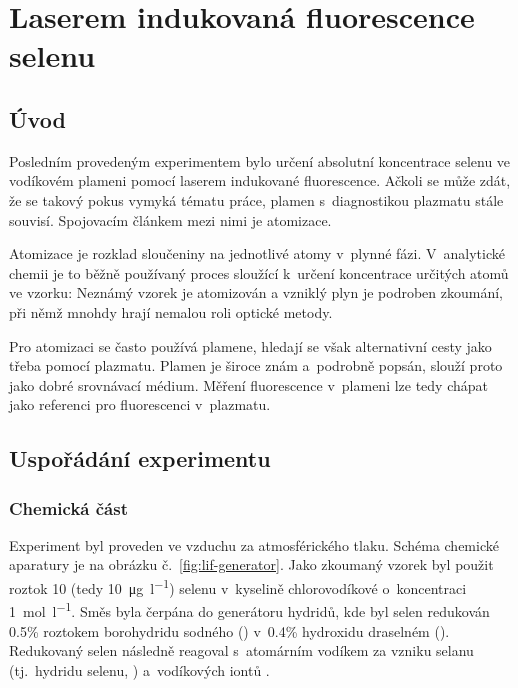 \chapter[LIF]{Laserem indukovaná fluorescence selenu}
\label{sec:lif}

\providecommand\xpos{x}
\providecommand\ypos{y}
\providecommand\xmm{x}
\providecommand\ymm{h}
\providecommand\voigtsigma{\sigma}
\providecommand\voigtgamma{\gamma}
\providecommand\lifslopex{\lifslope_\text{x}}
\providecommand\lifslopet{\lifslope_\text{t}}
\providecommand\lifsatx{\lifsat_\text{x}}
\providecommand\lifsatt{\lifsat_\text{t}}
\providecommand\lifslopeunit{10^9}
\providecommand\lifsatunit{\per\micro\joule}
\providecommand\ndensair{n_\text{R}}
\providecommand\ndensse{n_\text{Se}}
\providecommand\ndensseunc{\sigma_{\!n,\,\text{Se}}}
\renewcommand\einsteina{A_{32}}
\renewcommand\einsteinb{B_{13}}
\providecommand\einsteinai{A_{31}}



\section{Úvod}
\label{sec:lif-intro}
Posledním provedeným experimentem bylo určení absolutní koncentrace
selenu ve vodíkovém plameni pomocí laserem indukované fluorescence.
Ačkoli se může zdát, že se takový pokus vymyká tématu práce,
plamen s~diagnostikou plazmatu stále souvisí.
Spojovacím článkem mezi nimi je atomizace.

Atomizace je rozklad sloučeniny na jednotlivé atomy v~plynné fázi.
V~analytické chemii je to běžně používaný proces sloužící k~určení
koncentrace určitých atomů ve vzorku:
Neznámý vzorek je atomizován a vzniklý plyn je podroben zkoumání,
při němž mnohdy hrají nemalou roli optické metody.

Pro atomizaci se často používá plamene, hledají se však alternativní cesty
jako třeba pomocí plazmatu.
Plamen je široce znám a~podrobně popsán,
slouží proto jako dobré srovnávací médium.
Měření fluorescence v~plameni lze tedy chápat jako referenci
pro fluorescenci v~plazmatu.

\section{Uspořádání experimentu}
\label{sec:lif-setup}


\subsection{Chemická část}
\label{sec:lif-setup-chemistry}
Experiment byl proveden ve vzduchu za atmosférického tlaku.
Schéma chemické aparatury je na obrázku č.~\ref{fig:lif-generator}.
Jako zkoumaný vzorek byl použit roztok \SI{10}{\ppb}
(tedy \SI{10}{\micro\gram\per\litre})
selenu v kyselině chlorovodíkové  o koncentraci \SI{1}{\mol\per\litre}.
Směs byla čerpána do generátoru hydridů, kde byl selen redukován
\num{0.5}\si{\percent} roztokem borohydridu sodného ()
v~\num{0.4}\si{\percent} hydroxidu draselném ().
Redukovaný selen následně reagoval s~atomárním vodíkem za vzniku
selanu (tj.~hydridu selenu, ) a~vodíkových iontů .

